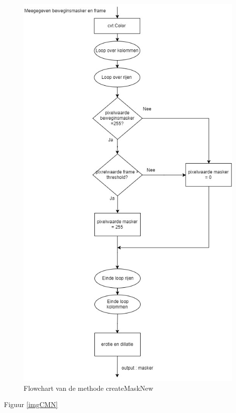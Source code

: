 \begin{figure}[hbp]
	\includegraphics[scale=0.6]{FlowChart_createMaskNew}
	\caption{Flowchart van de methode createMaskNew}
	\label{imgFCCMN}
\end{figure}
Figuur \ref{imgCMN}
